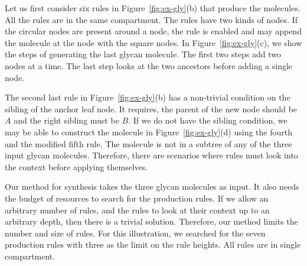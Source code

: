 Let us first consider six rules in Figure~\ref{fig:ex-gly}(b)
that produce the molecules.
All the rules are in the same compartment.
The rules have two kinds of nodes.
If the circular nodes are present around a node,
the rule is enabled and may append the molecule at the
node with the square nodes.
In Figure~\ref{fig:ex-gly}(c), we show the steps of generating the last
glycan molecule.
The first two steps add two nodes at a time.
The last step looks at the two ancestors before adding a single node.

The second last rule in Figure~\ref{fig:ex-gly}(b) has a non-trivial condition
on the sibling of the anchor leaf node.
It requires, the parent of the new node should be $A$ and the right sibling
must be $B$.
If we do not have the sibling condition, we may be able to construct the molecule
in Figure~\ref{fig:ex-gly}(d) using the fourth and the modified fifth rule.
The molecule is not in a subtree of any of the three input glycan molecules.
Therefore, there are scenarios where rules must look into the context before applying
themselves.



Our method for synthesis takes the three glycan molecules as input.
It also needs the budget of resources to search for the production rules.
If we allow an arbitrary number of rules,
and the rules to look at their context up to
an arbitrary depth, %
then there is a trivial solution.
Therefore, our method limits the number and size of rules.
For this illustration, we searched for the seven production rules with
three as the limit on the rule heights.
All rules are in single compartment.

